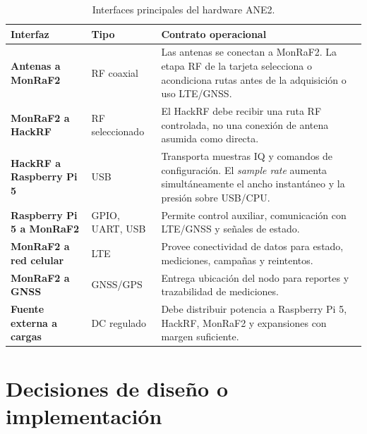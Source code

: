 \begin{table}[H]
\centering
\caption{Interfaces principales del hardware ANE2.}
\label{tab:hw_interfaces}
\begin{tabularx}{\textwidth}{>{\bfseries}p{3cm} p{3cm} X}
\toprule
Interfaz & Tipo & Contrato operacional \\
\midrule
Antenas a MonRaF2 & RF coaxial & Las antenas se conectan a MonRaF2. La etapa RF de la tarjeta selecciona o acondiciona rutas antes de la adquisición o uso LTE/GNSS. \\
MonRaF2 a HackRF & RF seleccionado & El HackRF debe recibir una ruta RF controlada, no una conexión de antena asumida como directa. \\
HackRF a Raspberry Pi 5 & USB & Transporta muestras IQ y comandos de configuración. El \textit{sample rate} aumenta simultáneamente el ancho instantáneo y la presión sobre USB/CPU. \\
Raspberry Pi 5 a MonRaF2 & GPIO, UART, USB & Permite control auxiliar, comunicación con LTE/GNSS y señales de estado. \\
MonRaF2 a red celular & LTE & Provee conectividad de datos para estado, mediciones, campañas y reintentos. \\
MonRaF2 a GNSS & GNSS/GPS & Entrega ubicación del nodo para reportes y trazabilidad de mediciones. \\
Fuente externa a cargas & DC regulado & Debe distribuir potencia a Raspberry Pi 5, HackRF, MonRaF2 y expansiones con margen suficiente. \\
\bottomrule
\end{tabularx}
\end{table}

\section{Decisiones de diseño o implementación}

